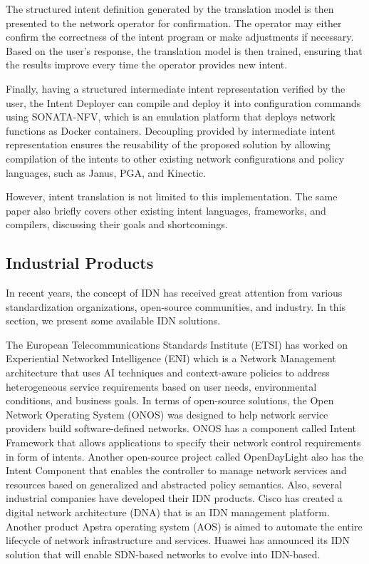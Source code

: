 The structured intent definition generated by the translation model is then presented to the network operator for confirmation. The operator may either confirm the correctness of the intent program or make adjustments if necessary. Based on the user’s response, the translation model is then trained, ensuring that the results improve every time the operator provides new intent.

Finally, having a structured intermediate intent representation verified by the user, the Intent Deployer can compile and deploy it into configuration commands using SONATA-NFV, which is an emulation platform that deploys network functions as Docker containers. Decoupling provided by intermediate intent representation ensures the reusability of the proposed solution by allowing compilation of the intents to other existing network configurations and policy languages, such as Janus, PGA, and Kinectic.

However, intent translation is not limited to this implementation. The same paper \cite[20]{Jacobs2018} also briefly covers other existing intent languages, frameworks, and compilers, discussing their goals and shortcomings.
  

\subsection{Industrial Products}

In recent years, the concept of IDN has received great attention from various standardization organizations, open-source communities, and industry. In this section, we present some available IDN solutions.

The European Telecommunications Standards Institute (ETSI) has worked on Experiential Networked Intelligence (ENI) which is a Network Management architecture that uses AI techniques and context-aware policies to address heterogeneous service requirements based on user needs, environmental conditions, and business goals. In terms of open-source solutions, the Open Network Operating System (ONOS) was designed to help network service providers build software-defined networks. ONOS has a component called Intent Framework that allows applications to specify their network control requirements in form of intents. Another open-source project called OpenDayLight also has the Intent Component that enables the controller to manage network services and resources based on generalized and abstracted policy semantics. Also, several industrial companies have developed their IDN products. Cisco has created a digital network architecture (DNA) that is an IDN management platform. Another product Apstra operating system (AOS) is aimed to automate the entire lifecycle of network infrastructure and services. Huawei has announced its IDN solution that will enable SDN-based networks to evolve into IDN-based.\cite{8968429}


